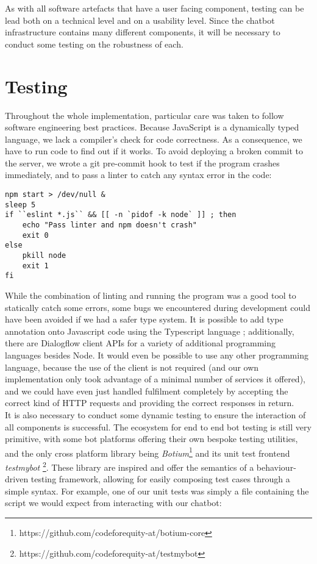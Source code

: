 As with all software artefacts that have a user facing component, testing can be lead both on a technical level and on a usability level. Since the chatbot infrastructure contains many different components, it will be necessary to conduct some testing on the robustness of each.
\section{Testing}
Throughout the whole implementation, particular care was taken to follow software engineering best practices. Because JavaScript is a dynamically typed language, we lack a compiler's check for code correctness. As a consequence, we have to run code to find out if it works. To avoid deploying a broken commit to the server, we wrote a git pre-commit hook to test if the program crashes immediately, and to pass a linter to catch any syntax error in the code:
\begin{lstlisting}
npm start > /dev/null &
sleep 5
if ``eslint *.js`` && [[ -n `pidof -k node` ]] ; then
    echo "Pass linter and npm doesn't crash"
    exit 0
else
    pkill node
    exit 1
fi
\end{lstlisting}
While the combination of linting and running the program was a good tool to statically catch some errors, some bugs we encountered during development could have been avoided if we had a safer type system. It is possible to add type annotation onto Javascript code using the Typescript language \cite{typescript}; additionally, there are Dialogflow client APIs for a variety of additional programming languages besides Node. It would even be possible to use any other programming language, because the use of the client is not required (and our own implementation only took advantage of a minimal number of services it offered), and we could have even just handled fulfilment completely by accepting the correct kind of HTTP requests and providing the correct responses in return. \\
It is also necessary to conduct some dynamic testing to ensure the interaction of all components is successful. The ecosystem for end to end bot testing is still very primitive, with some bot platforms offering their own bespoke testing utilities, and the only cross platform library being \textit{Botium}\footnote{https://github.com/codeforequity-at/botium-core} and its unit test frontend \textit{testmybot} \footnote{https://github.com/codeforequity-at/testmybot}. These library are inspired and offer the semantics of a behaviour-driven testing framework, allowing for easily composing test cases through a simple syntax. For example, one of our unit tests was simply a file containing the script we would expect from interacting with our chatbot:
